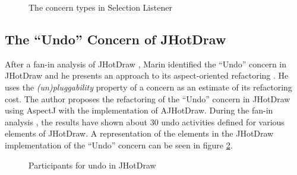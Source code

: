 \begin{figure}[H]
	\centering
  	\caption{The concern types in Selection Listener \cite{marin2005approach}}
  	\label{fig:Concerns_Selection_Listener}
\end{figure}

\subsection{The ``Undo'' Concern of JHotDraw}\label{The Undo Concern of JHotDraw}
After a fan-in analysis of JHotDraw \cite{marin2004identifying}, Marin identified the  ``Undo'' concern in JHotDraw and he presents an approach to its aspect-oriented refactoring \cite{marin2004refactoring}. 
He uses the \textit{(un)pluggability} property of a concern as an estimate of its refactoring cost. 
The author proposes the refactoring of the ``Undo'' concern in JHotDraw using AspectJ with the implementation of AJHotDraw. 
During the fan-in analysis \cite{marin2004identifying}, the results have shown about 30 undo activities defined for various elements of JHotDraw. 
A representation of the elements in the JHotDraw implementation of the ``Undo'' concern can be seen in figure \ref{fig:Participants_for_undo_in_JHotDraw}.

\begin{figure}[H]
	\centering
  	\caption{Participants for undo in JHotDraw \cite{marin2004refactoring}}
  	\label{fig:Participants_for_undo_in_JHotDraw}
\end{figure}

